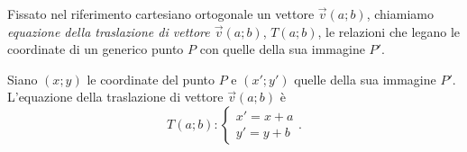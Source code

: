 \begin{definizione}
  Fissato nel riferimento cartesiano ortogonale un vettore 
  $\vec{v}(a;b)$, chiamiamo \emph{equazione della traslazione di 
     vettore $\vec{v}(a;b)$}, $T(a;b)$, le relazioni che legano le 
  coordinate di un generico punto $P$ con quelle della sua immagine 
  $P'$.
\end{definizione}

Siano $(x;y)$ le coordinate del punto $P$ e $(x';y')$ quelle della 
sua immagine $P'$. L'equazione della traslazione di vettore 
$\vec{v}(a;b)$ è
\[T(a;b):\begin{cases}x'=x+a\\y'=y+b\end{cases}.\]

% 
% 
% 
% 
